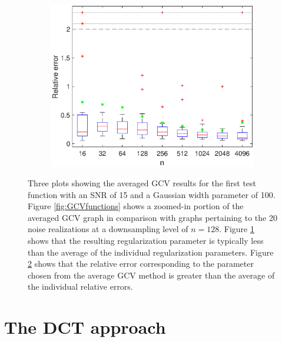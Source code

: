 \begin{figure}
\begin{subfigure}[b]{0.45\textwidth}
        \label{fig:GCVlambdas}
    \end{subfigure}
    \begin{subfigure}[b]{0.45\textwidth}
        \includegraphics[width=\textwidth]{Figures/GCV_ErrPlot1D_F1_S15_W100_R20.eps}
        \caption{}
        \label{fig:GCVerrors}
    \end{subfigure}
    \caption{Three plots showing the averaged GCV results for the first test function with an SNR of 15 and a Gaussian width parameter of 100. Figure \ref{fig:GCVfunctions} shows a zoomed-in portion of the averaged GCV graph in comparison with graphs pertaining to the 20 noise realizations at a downsampling level of $n = 128$. Figure \ref{fig:GCVlambdas} shows that the resulting regularization parameter is typically less than the average of the individual regularization parameters. Figure \ref{fig:GCVerrors} shows that the relative error corresponding to the parameter chosen from the average GCV method is greater than the average of the individual relative errors.}
\label{fig:GCVplots}
\end{figure}

\chapter{The DCT approach} \label{ch:DCT}

